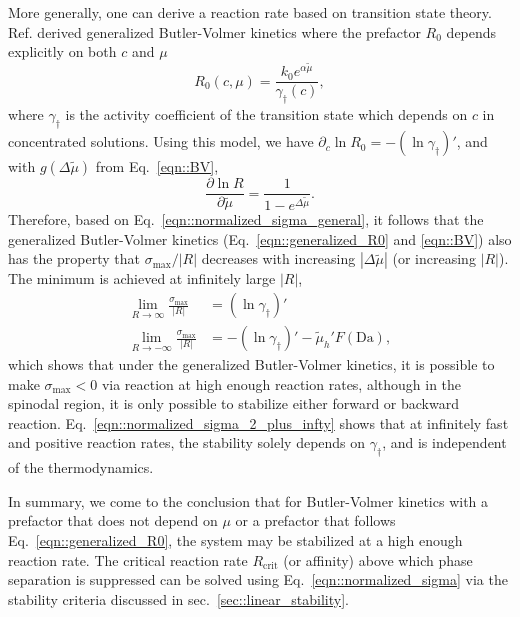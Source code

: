 \documentclass[reprint,aps,pre,superscriptaddress]{revtex4-2}
\newcommand{\pderiv}[2]{\frac{\partial {#1}}{\partial {#2}}}
\begin{document}
More generally, one can derive a reaction rate based on transition state theory.
Ref. \cite{Bazant2013} derived generalized Butler-Volmer kinetics where the prefactor $R_0$ depends explicitly on both $c$ and $\mu$
\begin{equation} \label{eqn::generalized_R0}
  R_0(c,\mu) = \frac{k_0 e^{\alpha\tilde{\mu}}}{\gamma_\dagger(c)},
\end{equation}
where $\gamma_\dagger$ is the activity coefficient of the transition state which depends on $c$ in concentrated solutions.
Using this model, we have $\partial_c\ln{R_0} = - (\ln{\gamma_\dagger})'$, and with $g(\Delta \tilde{\mu})$ from Eq.~\ref{eqn::BV},
\begin{equation}
  \pderiv{\ln{R}}{\tilde{\mu}} = \frac{1}{1-e^{\Delta \tilde{\mu}}}.
\end{equation}
Therefore, based on Eq.~\ref{eqn::normalized_sigma_general}, it follows that the generalized Butler-Volmer kinetics (Eq.~\ref{eqn::generalized_R0} and \ref{eqn::BV}) also has the property that $\sigma_\text{max}/|R|$ decreases with increasing $|\Delta \tilde{\mu}|$ (or increasing $|R|$). The minimum is achieved at infinitely large $|R|$,
\begin{align}
  \lim_{R\to\infty}{\frac{\sigma_\text{max}}{|R|}} &= (\ln{\gamma_\dagger})' \label{eqn::normalized_sigma_2_plus_infty}\\
  \lim_{R\to-\infty}{\frac{\sigma_\text{max}}{|R|}} &= -(\ln{\gamma_\dagger})' - \tilde{\mu}_h' F(\text{Da}) \label{eqn::normalized_sigma_2_minus_infty},
\end{align}
which shows that under the generalized Butler-Volmer kinetics, it is possible to make $\sigma_\text{max}<0$ via reaction at high enough reaction rates, although in the spinodal region, it is only possible to stabilize either forward or backward reaction. Eq.~\ref{eqn::normalized_sigma_2_plus_infty} shows that at infinitely fast and positive reaction rates, the stability solely depends on $\gamma_\dagger$, and is independent of the thermodynamics.

In summary, we come to the conclusion that for Butler-Volmer kinetics with a prefactor that does not depend on $\mu$ or a prefactor that follows Eq.~\ref{eqn::generalized_R0}, the system may be stabilized at a high enough reaction rate.
The critical reaction rate $R_\text{crit}$ (or affinity)  above which phase separation is suppressed can be solved using Eq.~\ref{eqn::normalized_sigma} via the stability criteria discussed in sec.~\ref{sec::linear_stability}.
\end{document}
